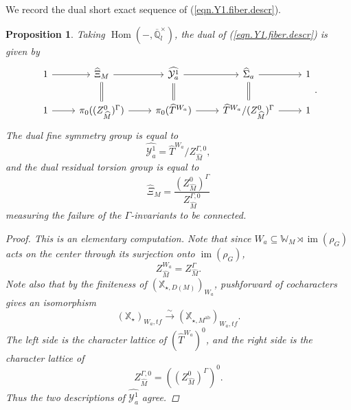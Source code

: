 \documentclass[openany]{amsbook}
\newtheorem{proposition}[theorem]{Proposition}
\theoremstyle{definition}
\theoremstyle{remark}
\numberwithin{equation}{section}
\newcommand{\Q}{\mathbb{Q}}
\newcommand{\W}{\mathbb{W}}
\newcommand{\cY}{\mathcal{Y}}
\newcommand{\im}{\operatorname{im}}
\newcommand{\ol}[1]{\overline{#1}}
\renewcommand{\-}{\operatorname{-}}
\newcommand{\Hom}{\operatorname{Hom}}
\newcommand{\bX}{\mathbb{X}}
\newcommand{\tf}{\mathit{tf}}
\newcommand{\ab}{\mathrm{ab}}
\begin{document}
We record the dual short exact sequence of (\ref{eqn.Y1.fiber.descr}).
\begin{proposition}\label{prop.dual.Y1.fibers}
    Taking $\Hom(-, \ol{\Q}_l^\times)$, the dual of (\ref{eqn.Y1.fiber.descr}) is given by
    $$
        \begin{tikzcd}[ampersand replacement=\&]
            1 \ar[r] \& \widehat{\Xi}_M \ar[r] \ar[d, equals] \& \widehat{\cY^1_a} \ar[r] \ar[d, equals] \& \widehat{\Sigma}_a \ar[r] \ar[d, equals] \& 1 \\
            1  \ar[r] \& \pi_0((Z_{\widehat{M}}^0)^\Gamma) \ar[r] \& \pi_0(\widehat{T}^{W_a}) \ar[r] \& \widehat{T}^{W_a}/(Z^0_{\widehat{M}})^\Gamma \ar[r] \& 1
        \end{tikzcd}.
    $$
    The dual fine symmetry group is equal to
    $$
        \widehat{\cY^1_a} = \widehat{T}^{W_a}/ Z^{\Gamma,0}_{\widehat{M}} ,
    $$
    and the dual residual torsion group is equal to
    $$
        \widehat{\Xi}_M = \frac{(Z_{\widehat{M}}^0)^\Gamma}{Z_{\widehat{M}}^{\Gamma,0}}
    $$
    measuring the failure of the $\Gamma$-invariants to be connected.
    \begin{proof}
        This is an elementary computation. Note that since $W_a \subseteq \W_M \rtimes \im(\rho_G)$ acts on the center through its surjection onto $\im(\rho_G)$, 
        $$
            Z_{\widehat{M}}^{W_a} = Z_{\widehat{M}}^{\Gamma}.
        $$
        Note also that by the finiteness of $(\bX_{\star, D(M)})_{W_a}$, pushforward of cocharacters gives an isomorphism
        $$
            (\bX_{\star})_{W_a, \tf} \xrightarrow{\sim} (\bX_{\star, M^{\ab}})_{W_a, \tf}.
        $$
        The left side is the character lattice of $(\widehat{T}^{W_a})^0$, and the right side is the character lattice of 
        $$
            Z_{\widehat{M}}^{\Gamma,0} = ((Z_{\widehat{M}}^0)^\Gamma)^0.
        $$
        Thus the two descriptions of $\widehat{\cY^1_a}$ agree.
    \end{proof}
\end{proposition}
\end{document}
